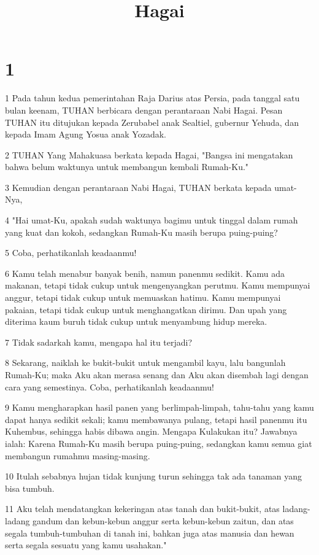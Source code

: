 

\title{Hagai}


\chapter{1}

\par 1 Pada tahun kedua pemerintahan Raja Darius atas Persia, pada tanggal satu bulan keenam, TUHAN berbicara dengan perantaraan Nabi Hagai. Pesan TUHAN itu ditujukan kepada Zerubabel anak Sealtiel, gubernur Yehuda, dan kepada Imam Agung Yosua anak Yozadak.
\par 2 TUHAN Yang Mahakuasa berkata kepada Hagai, "Bangsa ini mengatakan bahwa belum waktunya untuk membangun kembali Rumah-Ku."
\par 3 Kemudian dengan perantaraan Nabi Hagai, TUHAN berkata kepada umat-Nya,
\par 4 "Hai umat-Ku, apakah sudah waktunya bagimu untuk tinggal dalam rumah yang kuat dan kokoh, sedangkan Rumah-Ku masih berupa puing-puing?
\par 5 Coba, perhatikanlah keadaanmu!
\par 6 Kamu telah menabur banyak benih, namun panenmu sedikit. Kamu ada makanan, tetapi tidak cukup untuk mengenyangkan perutmu. Kamu mempunyai anggur, tetapi tidak cukup untuk memuaskan hatimu. Kamu mempunyai pakaian, tetapi tidak cukup untuk menghangatkan dirimu. Dan upah yang diterima kaum buruh tidak cukup untuk menyambung hidup mereka.
\par 7 Tidak sadarkah kamu, mengapa hal itu terjadi?
\par 8 Sekarang, naiklah ke bukit-bukit untuk mengambil kayu, lalu bangunlah Rumah-Ku; maka Aku akan merasa senang dan Aku akan disembah lagi dengan cara yang semestinya. Coba, perhatikanlah keadaanmu!
\par 9 Kamu mengharapkan hasil panen yang berlimpah-limpah, tahu-tahu yang kamu dapat hanya sedikit sekali; kamu membawanya pulang, tetapi hasil panenmu itu Kuhembus, sehingga habis dibawa angin. Mengapa Kulakukan itu? Jawabnya ialah: Karena Rumah-Ku masih berupa puing-puing, sedangkan kamu semua giat membangun rumahmu masing-masing.
\par 10 Itulah sebabnya hujan tidak kunjung turun sehingga tak ada tanaman yang bisa tumbuh.
\par 11 Aku telah mendatangkan kekeringan atas tanah dan bukit-bukit, atas ladang-ladang gandum dan kebun-kebun anggur serta kebun-kebun zaitun, dan atas segala tumbuh-tumbuhan di tanah ini, bahkan juga atas manusia dan hewan serta segala sesuatu yang kamu usahakan."
